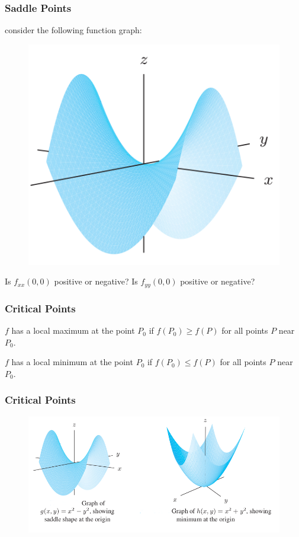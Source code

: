 \documentclass[xcolor=dvipsnames]{beamer}
\begin{document}
\begin{frame}
  \frametitle{Saddle Points}
  consider the following function graph:
  \begin{figure}[h]
    \includegraphics[scale=0.35]{./diagrams/saddle.png}
  \end{figure}
  Is $f_{xx}(0,0)$ positive or negative? Is $f_{yy}(0,0)$ positive or negative? 
\end{frame}

\begin{frame}
  \frametitle{Critical Points}
  $f$ has a \alert{local maximum} at the point $P_{0}$ if $f(P_{0})\geq{}f(P)$
  for all points $P$ near $P_{0}$.

  \bigskip

  $f$ has a \alert{local minimum} at the point $P_{0}$ if $f(P_{0})\leq{}f(P)$
  for all points $P$ near $P_{0}$.
\end{frame}

\begin{frame}
  \frametitle{Critical Points}
  \begin{figure}[h]
    \includegraphics[scale=0.42]{./diagrams/critpoints.png}
  \end{figure}
\end{frame}
\end{document}
